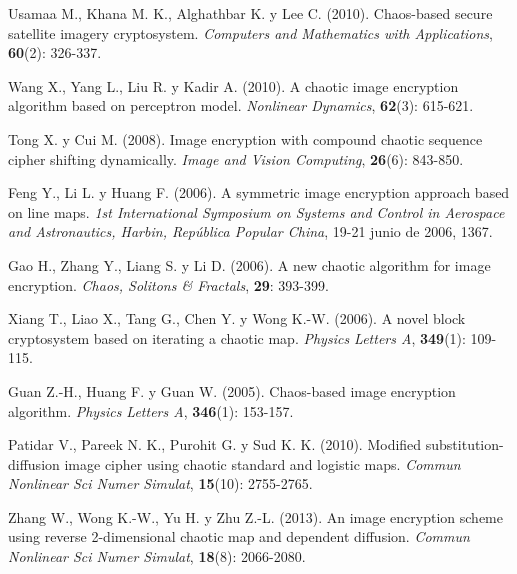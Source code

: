 \begin{thebibliography}{00}
Usamaa M., Khana M. K., Alghathbar K. y Lee C. (2010).
\newblock Chaos-based secure satellite imagery cryptosystem.
\newblock \emph{Computers and Mathematics with Applications}, \textbf{60}(2): 326-337.

Wang X., Yang L., Liu R. y Kadir A. (2010).
\newblock A chaotic image encryption algorithm based on perceptron model.
\newblock \emph{Nonlinear Dynamics}, \textbf{62}(3): 615-621.

Tong X. y Cui M. (2008).
\newblock Image encryption with compound chaotic sequence cipher shifting dynamically.
\newblock \emph{Image and Vision Computing}, \textbf{26}(6): 843-850.

Feng Y., Li L. y Huang F. (2006).
\newblock A symmetric image encryption approach based on line maps.
\newblock \emph{1st International Symposium on Systems and Control in Aerospace and Astronautics, Harbin, República Popular China}, 19-21 junio de 2006, 1367.

Gao H., Zhang Y., Liang S. y Li D. (2006).
\newblock  A new chaotic algorithm for image encryption.
\newblock \emph{Chaos, Solitons \& Fractals}, \textbf{29}: 393-399.

Xiang T., Liao X., Tang G., Chen Y. y Wong K.-W. (2006).
\newblock A novel block cryptosystem based on iterating a chaotic map.
\newblock \emph{Physics Letters A}, \textbf{349}(1): 109-115.

Guan Z.-H., Huang F. y Guan W. (2005).
\newblock Chaos-based image encryption algorithm.
\newblock \emph{Physics Letters A}, \textbf{346}(1): 153-157.

Patidar V., Pareek N. K., Purohit G. y Sud K. K. (2010).
\newblock Modified substitution-diffusion image cipher using chaotic standard and logistic maps.
\newblock \emph{Commun Nonlinear Sci Numer Simulat}, \textbf{15}(10): 2755-2765.

Zhang W., Wong K.-W., Yu H. y Zhu Z.-L. (2013).
\newblock An image encryption scheme using reverse 2-dimensional chaotic map and dependent diffusion.
\newblock \emph{Commun Nonlinear Sci Numer Simulat}, \textbf{18}(8): 2066-2080.


\end{thebibliography}
